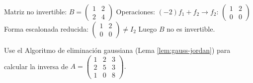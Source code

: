 \begin{example}
Matriz no invertible: $B = \begin{pmatrix} 1 & 2 \\ 2 & 4 \end{pmatrix}$  
Operaciones:  
$(-2)f_1 + f_2 \to f_2$: $\begin{pmatrix} \boxed{1} & 2 \\ 0 & 0 \end{pmatrix}$  
Forma escalonada reducida: $\begin{pmatrix} 1 & 2 \\ 0 & 0 \end{pmatrix} \neq I_2$  
Luego $B$ no es invertible.
\end{example}
\begin{prob}\label{ej.inversa} Use el Algoritmo de eliminación gaussiana (Lema \ref{lem:gauss-jordan}) para calcular la inversa de $A=\begin{pmatrix}1&2&3\\2&5&3\\1&0&8 \end{pmatrix}.$

\end{prob}
